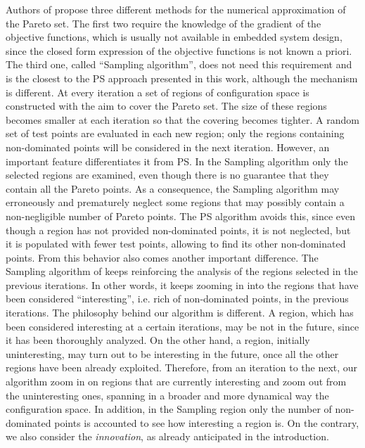 Authors of \cite{dellnitz2005covering,dellnitz2009computation} propose
three different methods for the numerical approximation of the Pareto
set. The first two require the knowledge of the gradient of the
objective functions, which is usually not available in embedded system
design, since the closed form expression of the objective functions is
not known a priori. The third one, called ``Sampling algorithm'', does
not need this requirement and is the closest to the PS approach
presented in this work, although the
mechanism is different. At every iteration a set of regions of
configuration space is constructed with the aim to cover the Pareto
set. The size of these regions becomes smaller at each iteration so
that the covering becomes tighter. A random set of test points are
evaluated in each new region; only the regions containing
non-dominated points will be considered in the next iteration.
However, an important feature differentiates it from PS. In the Sampling algorithm only the
selected regions are examined, even though there is no guarantee that
they contain all the Pareto points. As a consequence, the
Sampling algorithm may erroneously and prematurely neglect some
regions that may possibly contain a non-negligible number of Pareto
points. The PS algorithm avoids this, since even though a region has not
provided non-dominated points, it is not neglected, but it is
populated with fewer test points, allowing to
find its other non-dominated points. From this behavior also comes
another important difference. The Sampling algorithm of
\cite{dellnitz2005covering} keeps reinforcing the analysis of the
regions selected in the previous iterations. In other words, it keeps
zooming in into the regions that have been considered ``interesting'',
i.e. rich of non-dominated points, in the previous iterations. The
philosophy behind our algorithm is different. A region, which has been
considered interesting at a certain iterations, may be not in the
future, since it has been thoroughly analyzed. On the other hand, a
region, initially uninteresting, may turn out to be interesting in the
future, once all the other regions have been already exploited.
Therefore, from an iteration to the next, our algorithm zoom in on
regions that are currently interesting and zoom out from the
uninteresting ones,  spanning in a broader and more dynamical way the
configuration space. In addition, in the Sampling region only the
number of non-dominated points is accounted to see how interesting a
region is. On the contrary, we also consider the \emph{innovation}, as
already anticipated in the introduction.

